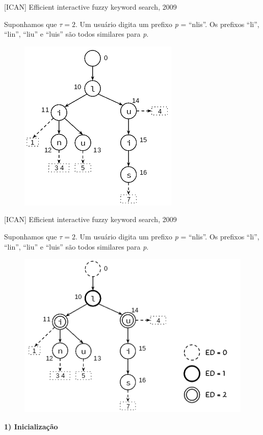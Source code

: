 \documentclass[11pt]{beamer}
\begin{document}
\begin{frame}{[ICAN] Efficient interactive fuzzy keyword search, 2009}

    \small
    Suponhamos que $\tau = 2$. Um usuário digita um prefixo \textit{p} = ``nlis''. Os prefixos ``li'', ``lin'', ``liu'' e ``luis'' são todos similares para \textit{p}. \pause

    \begin{figure}
      \includegraphics[scale=0.50]{pictures/ican_1.png}
      \centering
    \end{figure}
    
\end{frame}

\begin{frame}{[ICAN] Efficient interactive fuzzy keyword search, 2009}
    
    \small
    Suponhamos que $\tau = 2$. Um usuário digita um prefixo \textit{p} = ``nlis''. Os prefixos ``li'', ``lin'', ``liu'' e ``luis'' são todos similares para \textit{p}.

    \begin{figure}
      \includegraphics[scale=0.45]{pictures/ican_2.png}
      \centering
    \end{figure}
    
    \textbf{1) Inicialização}
    
\end{frame}
\end{document}

